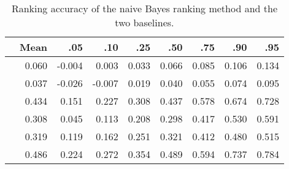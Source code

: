 \begin{table}[hp]

\caption{Ranking accuracy of the naive Bayes ranking method and the two baselines.}
\label{stat:acc}
\begin{center}
\begin{tabular}{rrrrrrrrr}
  \toprule
 & Mean & .05 & .10 & .25 & .50 & .75 & .90 & .95 \\ 
\midrule
\naive{} & 0.060 & -0.004 & 0.003 & 0.033 & 0.066 & 0.085 & 0.106 & 0.134 \\ 
  {} & 0.037 & -0.026 & -0.007 & 0.019 & 0.040 & 0.055 & 0.074 & 0.095 \\ 
  \raw{} & 0.434 & 0.151 & 0.227 & 0.308 & 0.437 & 0.578 & 0.674 & 0.728 \\ 
  \diff{} & 0.308 & 0.045 & 0.113 & 0.208 & 0.298 & 0.417 & 0.530 & 0.591 \\ 
  \random{} & 0.319 & 0.119 & 0.162 & 0.251 & 0.321 & 0.412 & 0.480 & 0.515 \\ 
  \rollsd{} & 0.486 & 0.224 & 0.272 & 0.354 & 0.489 & 0.594 & 0.737 & 0.784 \\ 
   \bottomrule
\end{tabular}
\end{center}
\end{table}


